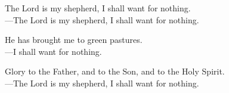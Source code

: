 \responsory

\noindent The Lord is my shepherd, I shall want for nothing.\\
{\color{red}---\thinspace}The Lord is my shepherd, I shall want for nothing.

\medskip\noindent He has brought me to green pastures.\\
{\color{red}---\thinspace}I shall want for nothing.

\medskip\noindent Glory to the Father, and to the Son, and to the Holy Spirit.\\
{\color{red}---\thinspace}The Lord is my shepherd, I shall want for nothing.